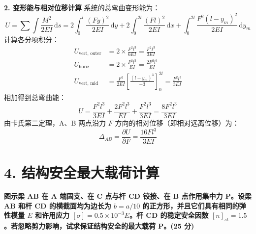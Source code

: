 \documentclass[11pt,a4paper]{ctexrep}
\newcommand{\diff}{\,\mathrm{d}}
\begin{document}
{\textbf{2. 变形能与相对位移计算}
系统的总弯曲变形能为：
\[
U = \sum \int \frac{M^2}{2EI} \diff s = 2 \int_0^l \frac{(Fy)^2}{2EI} \diff y + 2 \int_0^{2l} \frac{(Fl)^2}{2EI} \diff x + \int_0^{2l} \frac{F^2(l - y_m)^2}{2EI} \diff y_m
\]
计算各分项积分：
\begin{align*}
U_{\text{vert, outer}} &= 2 \times \frac{F^2 l^3}{6EI} = \frac{F^2 l^3}{3EI} \\
U_{\text{horiz}} &= 2 \times \frac{F^2 l^3}{EI} = \frac{2F^2 l^3}{EI} \\
U_{\text{vert, mid}} &= \frac{F^2}{2EI} \left[ \frac{(l-y_m)^3}{-3} \right]_0^{2l} = \frac{F^2 l^3}{3EI}
\end{align*}
相加得到总弯曲能：
\[
U = \frac{F^2 l^3}{3EI} + \frac{2F^2 l^3}{EI} + \frac{F^2 l^3}{3EI} = \frac{8 F^2 l^3}{3EI}
\]
由卡氏第二定理，A、B 两点沿力 $F$ 方向的相对位移（即相对远离位移）为：
\[
\Delta_{AB} = \frac{\partial U}{\partial F} = \frac{16 F l^3}{3EI}
\]




\section*{4. 结构安全最大载荷计算}

\textbf{图示梁 AB 在 A 端固支、在 C 点与杆 CD 铰接、在 B 点作用集中力 P。设梁 AB 和杆 CD 的横截面均为边长为 $b = a/10$ 的正方形，并且它们具有相同的弹性模量 $E$ 和许用应力 $[\sigma] = 0.5 \times 10^{-3} E$。杆 CD 的稳定安全因数 $[n]_{st} = 1.5$。若忽略剪力影响，试求保证结构安全的最大载荷 P。(25 分)}

\begin{center}
\end{center}}
\end{document}

